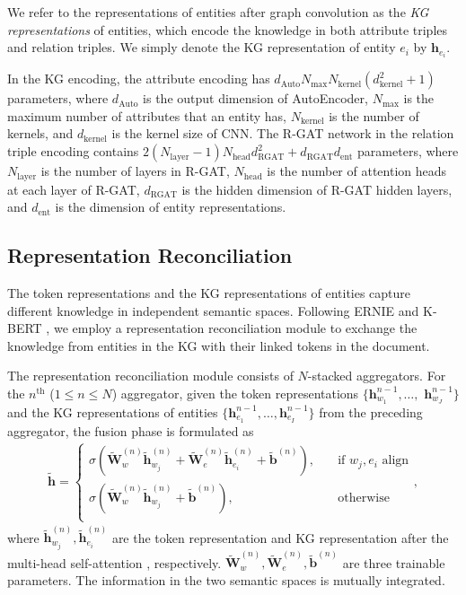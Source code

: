 \documentclass[runningheads]{llncs}
\begin{document}
We refer to the representations of entities after graph convolution as the \emph{KG representations} of entities, which encode the knowledge in both attribute triples and relation triples. 
We simply denote the KG representation of entity $e_i$ by $\mathbf{h}_{e_i}$.

In the KG encoding, the attribute encoding has $d_\text{Auto}N_\text{max}N_\text{kernel}(d_\text{kernel}^2+1)$ parameters, where $d_\text{Auto}$ is the output dimension of AutoEncoder, $N_\text{max}$ is the maximum number of attributes that an entity has, $N_\text{kernel}$ is the number of kernels, and $d_\text{kernel}$ is the kernel size of CNN. 
The R-GAT network in the relation triple encoding contains $2(N_\text{layer}-1)N_\text{head}d_\text{RGAT}^2+d_\text{RGAT}d_\text{ent}$ parameters, where $N_\text{layer}$ is the number of layers in R-GAT, $N_\text{head}$ is the number of attention heads at each layer of R-GAT, $d_\text{RGAT}$ is the hidden dimension of R-GAT hidden layers, and $d_\text{ent}$ is the dimension of entity representations.
\subsection{Representation Reconciliation}
\label{subsect:aggr}

The token representations and the KG representations of entities capture different knowledge in independent semantic spaces. 
Following ERNIE \cite{zhang2019ernie} and K-BERT \cite{liu2020kbert}, we employ a representation reconciliation module to exchange the knowledge from entities in the KG with their linked tokens in the document.

The representation reconciliation module consists of $N$-stacked aggregators. 
For the $n^\text{th}$ ($1\le n\le N$) aggregator, given the token representations $\{\mathbf{h}_{w_1}^{n-1},\dots,$ $\mathbf{h}_{w_J}^{n-1}\}$ and the KG representations of entities $\{\mathbf{h}_{e_1}^{n-1}, \dots, \mathbf{h}_{e_I}^{n-1}\}$ from the preceding aggregator, the fusion phase is formulated as
\begin{align}
\tilde{\mathbf{h}} = \left\{
\begin{array}{ll}
	\sigma (\tilde{\mathbf{W}}_w^{(n)} \tilde{\mathbf{h}}_{w_j}^{(n)} + \tilde{\mathbf{W}}_e^{(n)} \tilde{\mathbf{h}}_{e_i}^{(n)} + \tilde{\mathbf{b}}^{(n)}), & \quad\text{if } w_j, e_i \text{ align} \\
	\sigma (\tilde{\mathbf{W}}_w^{(n)} \tilde{\mathbf{h}}_{w_j}^{(n)} + \tilde{\mathbf{b}}^{(n)}), & \quad\text{otherwise} \\
\end{array},
\right.
\end{align}
where $\tilde{\mathbf{h}}_{w_j}^{(n)},\tilde{\mathbf{h}}_{e_i}^{(n)}$ are the token representation and KG representation after the multi-head self-attention \cite{vaswani2017attention}, respectively. 
$\tilde{\mathbf{W}}_w^{(n)}, \tilde{\mathbf{W}}_e^{(n)},\tilde{\mathbf{b}}^{(n)}$ are three trainable parameters.
The information in the two semantic spaces is mutually integrated.
\end{document}
